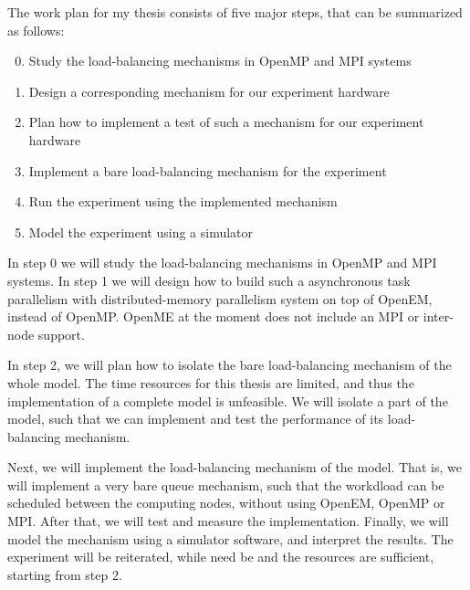 The work plan for my thesis consists of five major steps, that can be summarized as follows:

\begin{enumerate}
\setcounter{enumi}{-1}
\item Study the load-balancing mechanisms in OpenMP and MPI systems
\item Design a corresponding mechanism for our experiment hardware
\item Plan how to implement a test of such a mechanism for our experiment hardware
\item Implement a bare load-balancing mechanism for the experiment
\item Run the experiment using the implemented mechanism
\item Model the experiment using a simulator
\end{enumerate}

In step 0 we will study the load-balancing mechanisms in OpenMP and MPI systems. In step 1 we will design how to build such a asynchronous task parallelism with distributed-memory parallelism system on top of OpenEM, instead of OpenMP. OpenME at the moment does not include an MPI or inter-node support.

In step 2, we will plan how to isolate the bare load-balancing mechanism of the whole model. The time resources for this thesis are limited, and thus the implementation of a complete model is unfeasible. We will isolate a part of the model, such that we can implement and test the performance of its load-balancing mechanism.

Next, we will implement the load-balancing mechanism of the model. That is, we will implement a very bare queue mechanism, such that the workdload can be scheduled between the computing nodes, without using OpenEM, OpenMP or MPI. After that, we will test and measure the implementation. Finally, we will model the mechanism using a simulator software, and interpret the results. The experiment will be reiterated, while need be and the resources are sufficient, starting from step 2.

